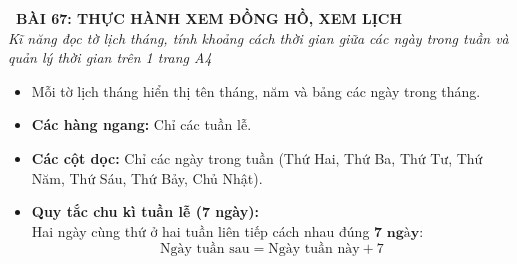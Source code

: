 \documentclass[11pt,a4paper]{article}
\begin{document}
\begin{tcolorbox}[
  enhanced,
  colback=white,
  colframe=primary,
  arc=3mm,
  boxrule=1.2pt,
  left=4mm, right=4mm, top=2.5mm, bottom=2.5mm,
  drop shadow=black!10!white
]
  \centering
  {\Large\bfseries\color{primary}\faBookmark\ BÀI 67: THỰC HÀNH XEM ĐỒNG HỒ, XEM LỊCH}\\[1.5mm]
  {\small\itshape\color{black!75}Kĩ năng đọc tờ lịch tháng, tính khoảng cách thời gian giữa các ngày trong tuần và quản lý thời gian trên 1 trang A4}
\end{tcolorbox}

\vspace{-2mm}


\noindent
\begin{minipage}[t]{0.49\textwidth}\vspace{0pt}
\begin{tcolorbox}[
  enhanced,
  colback=blue!4!white,
  colframe=blue!75!black,
  arc=2mm, boxrule=0.8pt,
  left=2mm, right=2mm, top=1.8mm, bottom=1.8mm,
  title={\footnotesize\bfseries\color{white}\faKey\ 1. Kĩ năng đọc tờ lịch tháng}
]
{\footnotesize
\begin{itemize}\setlength{\itemsep}{1.5pt}\setlength{\leftskip}{-2.5mm}
  \item Mỗi tờ lịch tháng hiển thị tên tháng, năm và bảng các ngày trong tháng.
  \item \textbf{Các hàng ngang:} Chỉ các tuần lễ.
  \item \textbf{Các cột dọc:} Chỉ các ngày trong tuần (Thứ Hai, Thứ Ba, Thứ Tư, Thứ Năm, Thứ Sáu, Thứ Bảy, Chủ Nhật).
  \item \textbf{Quy tắc chu kì tuần lễ (7 ngày):}\\
  Hai ngày cùng thứ ở hai tuần liên tiếp cách nhau đúng $\mathbf{7\text{ ngày}}$:
  $$\text{Ngày tuần sau} = \text{Ngày tuần này} + 7$$
\end{itemize}
}
\end{tcolorbox}
\end{minipage}
\hfill
\end{document}
